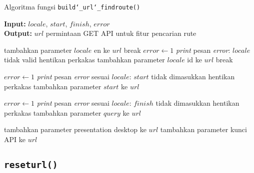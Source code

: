 \begin{algorithm}[h]
	\caption{\textendash\xspace Algoritma fungsi \texttt{build\char`_url\char`_findroute()}}
	\label{alg:design-buildurl-findroute}
	\vspace{-0.6\baselineskip}
	\begin{flushleft}
        \textbf{Input:} $locale$, $start$, $finish$, $error$ \\
        \textbf{Output:} $url$ permintaan GET API untuk fitur pencarian rute \\
	\end{flushleft}
	\vspace{-1.05\baselineskip}
	\begin{algorithmic}
	
			    \State tambahkan parameter $locale$ \textquotesingle\textquotesingle en\textquotesingle\textquotesingle\xspace ke $url$
				\State break
			\EndCase
			    \State $error \gets 1$
				\State \textit{print} pesan \textit{error}: $locale$ tidak valid
				\State hentikan perkakas
			\EndCase
			\Default
				\State tambahkan parameter $locale$ \textquotesingle\textquotesingle id\textquotesingle\textquotesingle\xspace ke $url$
				\State break
			\EndDefault
		\EndSwitch
		
		    \State $error \gets 1$
			\State \textit{print} pesan \textit{error} sesuai $locale$: $start$ tidak dimasukkan
			\State hentikan perkakas
		\Else
			\State tambahkan parameter $start$ ke $url$
		\EndIf
		
		    \State $error \gets 1$
			\State \textit{print} pesan \textit{error} sesuai $locale$: $finish$ tidak dimasukkan
			\State hentikan perkakas
		\Else
			\State tambahkan parameter $query$ ke $url$
		\EndIf
		
		\State tambahkan parameter presentation \textquotesingle\textquotesingle desktop\textquotesingle\textquotesingle\xspace ke $url$
		\State tambahkan parameter kunci API ke $url$
		
		\State {}
	\end{algorithmic}
\end{algorithm}

\subsection{\texttt{reset\textunderscore url()}}
\label{sec:design-code-buildurl-reset}


